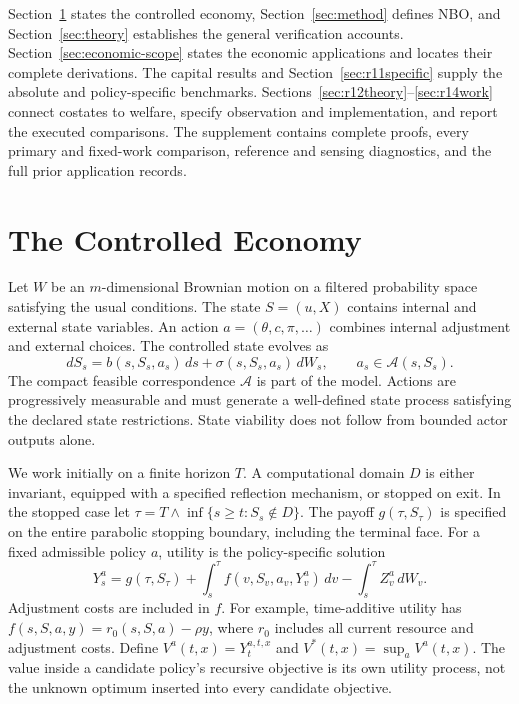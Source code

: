 \documentclass[ecta,nameyear,draft]{econsocart}
\theoremstyle{definition}
\theoremstyle{remark}
\newcommand{\Act}{\mathcal A}
\begin{document}
Section~\ref{sec:model} states the controlled economy, Section~\ref{sec:method} defines NBO, and Section~\ref{sec:theory} establishes the general verification accounts. Section~\ref{sec:economic-scope} states the economic applications and locates their complete derivations. The capital results and Section~\ref{sec:r11specific} supply the absolute and policy-specific benchmarks. Sections~\ref{sec:r12theory}--\ref{sec:r14work} connect costates to welfare, specify observation and implementation, and report the executed comparisons. The supplement contains complete proofs, every primary and fixed-work comparison, reference and sensing diagnostics, and the full prior application records.

\section{The Controlled Economy}\label{sec:model}
Let $W$ be an $m$-dimensional Brownian motion on a filtered probability space satisfying the usual conditions. The state $S=(u,X)$ contains internal and external state variables. An action $a=(\theta,c,\pi,\ldots)$ combines internal adjustment and external choices. The controlled state evolves as
\begin{equation}\label{eq:state}
 dS_s=b(s,S_s,a_s)\,ds+\sigma(s,S_s,a_s)\,dW_s,
 \qquad a_s\in\Act(s,S_s).
\end{equation}
The compact feasible correspondence $\Act$ is part of the model. Actions are progressively measurable and must generate a well-defined state process satisfying the declared state restrictions. State viability does not follow from bounded actor outputs alone.

We work initially on a finite horizon $T$. A computational domain $D$ is either invariant, equipped with a specified reflection mechanism, or stopped on exit. In the stopped case let $\tau=T\wedge\inf\{s\geq t:S_s\notin D\}$. The payoff $g(\tau,S_\tau)$ is specified on the entire parabolic stopping boundary, including the terminal face. For a fixed admissible policy $a$, utility is the policy-specific solution
\begin{equation}\label{eq:bsde}
 Y_s^a=g(\tau,S_\tau)+\int_s^\tau f(v,S_v,a_v,Y_v^a)\,dv
                    -\int_s^\tau Z_v^a\,dW_v.
\end{equation}
Adjustment costs are included in $f$. For example, time-additive utility has $f(s,S,a,y)=r_0(s,S,a)-\rho y$, where $r_0$ includes all current resource and adjustment costs. Define $V^a(t,x)=Y_t^{a,t,x}$ and $V^*(t,x)=\sup_a V^a(t,x)$. The value inside a candidate policy's recursive objective is its own utility process, not the unknown optimum inserted into every candidate objective.
\end{document}
